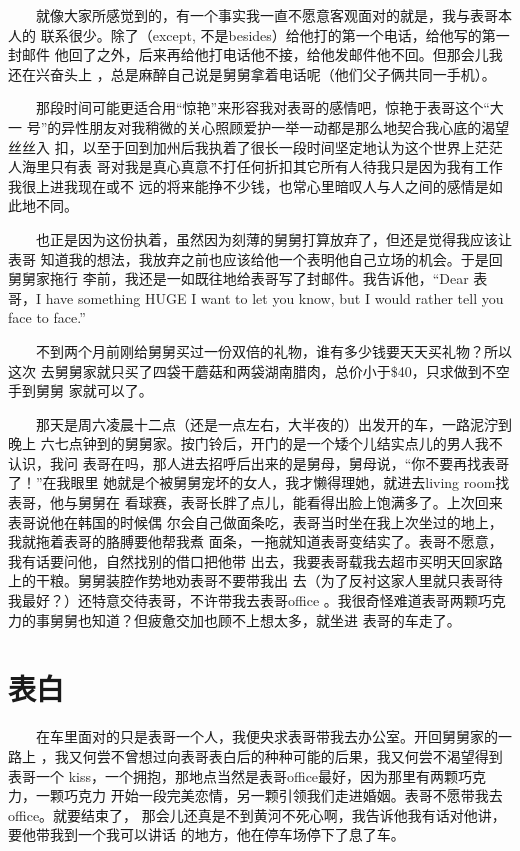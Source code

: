\documentclass[12pt]{book}
\begin{document}
　　就像大家所感觉到的，有一个事实我一直不愿意客观面对的就是，我与表哥本人的
联系很少。除了（except, 不是besides）给他打的第一个电话，给他写的第一封邮件
他回了之外，后来再给他打电话他不接，给他发邮件他不回。但那会儿我还在兴奋头上
，总是麻醉自己说是舅舅拿着电话呢（他们父子俩共同一手机）。

　　那段时间可能更适合用“惊艳”来形容我对表哥的感情吧，惊艳于表哥这个“大一
号”的异性朋友对我稍微的关心照顾爱护一举一动都是那么地契合我心底的渴望丝丝入
扣，以至于回到加州后我执着了很长一段时间坚定地认为这个世界上茫茫人海里只有表
哥对我是真心真意不打任何折扣其它所有人待我只是因为我有工作我很上进我现在或不
远的将来能挣不少钱，也常心里暗叹人与人之间的感情是如此地不同。

　　也正是因为这份执着，虽然因为刻薄的舅舅打算放弃了，但还是觉得我应该让表哥
知道我的想法，我放弃之前也应该给他一个表明他自己立场的机会。于是回舅舅家拖行
李前，我还是一如既往地给表哥写了封邮件。我告诉他，“Dear 表哥，I have 
something HUGE I want to let you know, but I would rather tell you face to 
face.”

　　不到两个月前刚给舅舅买过一份双倍的礼物，谁有多少钱要天天买礼物？所以这次
去舅舅家就只买了四袋干蘑菇和两袋湖南腊肉，总价小于\$40，只求做到不空手到舅舅
家就可以了。

　　那天是周六凌晨十二点（还是一点左右，大半夜的）出发开的车，一路泥泞到晚上
六七点钟到的舅舅家。按门铃后，开门的是一个矮个儿结实点儿的男人我不认识，我问
表哥在吗，那人进去招呼后出来的是舅母，舅母说，“你不要再找表哥了！”在我眼里
她就是个被舅舅宠坏的女人，我才懒得理她，就进去living room找表哥，他与舅舅在
看球赛，表哥长胖了点儿，能看得出脸上饱满多了。上次回来表哥说他在韩国的时候偶
尔会自己做面条吃，表哥当时坐在我上次坐过的地上，我就拖着表哥的胳膊要他帮我煮
面条，一拖就知道表哥变结实了。表哥不愿意，我有话要问他，自然找别的借口把他带
出去，我要表哥载我去超市买明天回家路上的干粮。舅舅装腔作势地劝表哥不要带我出
去（为了反衬这家人里就只表哥待我最好？）还特意交待表哥，不许带我去表哥office
。我很奇怪难道表哥两颗巧克力的事舅舅也知道？但疲惫交加也顾不上想太多，就坐进
表哥的车走了。
\section{表白}
\label{sec-8-5}

　　在车里面对的只是表哥一个人，我便央求表哥带我去办公室。开回舅舅家的一路上
，我又何尝不曾想过向表哥表白后的种种可能的后果，我又何尝不渴望得到表哥一个
kiss，一个拥抱，那地点当然是表哥office最好，因为那里有两颗巧克力，一颗巧克力
开始一段完美恋情，另一颗引领我们走进婚姻。表哥不愿带我去office。就要结束了，
那会儿还真是不到黄河不死心啊，我告诉他我有话对他讲，要他带我到一个我可以讲话
的地方，他在停车场停下了息了车。
\end{document}
